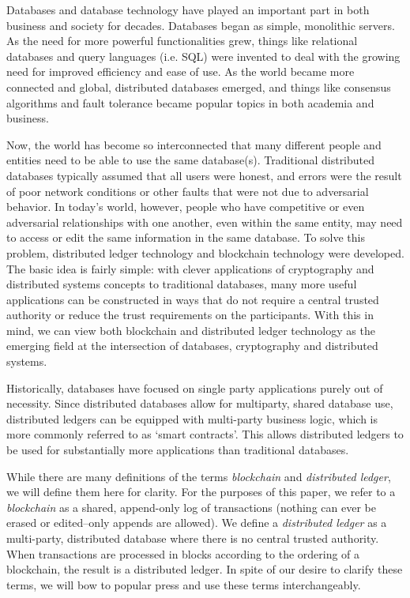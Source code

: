 Databases and database technology have played an important part in both business and society for decades. Databases began as simple, monolithic servers. As the need for more powerful functionalities grew, things like relational databases and query languages (i.e. SQL) were invented to deal with the growing need for improved efficiency and ease of use. As the world became more connected and global, distributed databases emerged, and things like consensus algorithms and fault tolerance became popular topics in both academia and business.

Now, the world has become so interconnected that many different people and entities need to be able to use the same database(s). Traditional distributed databases typically assumed that all users were honest, and errors were the result of poor network conditions or other faults that were not due to adversarial behavior. In today's world, however, people who have competitive or even adversarial relationships with one another, even within the same entity, may need to access or edit the same information in the same database. To solve this problem, distributed ledger technology and blockchain technology were developed. The basic idea is fairly simple: with clever applications of cryptography and distributed systems concepts to traditional databases, many more useful applications can be constructed in ways that do not require a central trusted authority or reduce the trust requirements on the participants. With this in mind, we can view both blockchain and distributed ledger technology as the emerging field at the intersection of databases, cryptography and distributed systems.

Historically, databases have focused on single party applications purely out of necessity.  Since distributed databases allow for multiparty, shared database use, distributed ledgers can be equipped with multi-party business logic, which is more commonly referred to as `smart contracts’.  This allows distributed ledgers to be used for substantially more applications than traditional databases.

While there are many definitions of the terms \emph{blockchain} and \emph{distributed ledger}, we will define them here for clarity. For the purposes of this paper, we refer to a \emph{blockchain} as a shared, append-only log of transactions (nothing can ever be erased or edited--only appends are allowed). We define a \emph{distributed ledger} as a multi-party, distributed database where there is no central trusted authority. When transactions are processed in blocks according to the ordering of a blockchain, the result is a distributed ledger.  In spite of our desire to clarify these terms, we will bow to popular press and use these terms interchangeably. 

